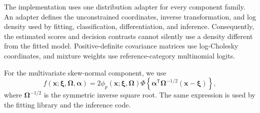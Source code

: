 The implementation uses one distribution adapter for every component family.
An adapter defines the unconstrained coordinates, inverse transformation, and
log density used by fitting, classification, differentiation, and inference.
Consequently, the estimated scores and decision contrasts cannot silently use
a density different from the fitted model.  Positive-definite covariance
matrices use log-Cholesky coordinates, and mixture weights use
reference-category multinomial logits.

\begin{center}
\end{center}

For the multivariate skew-normal component, we use
\begin{equation}
 f(\mathbf{x};\boldsymbol{\xi},\boldsymbol{\Omega},\boldsymbol{\alpha})
 =2\phi_p(\mathbf{x};\boldsymbol{\xi},\boldsymbol{\Omega})
 \Phi\!\left\{
 \boldsymbol{\alpha}^{\mathsf T}\boldsymbol{\Omega}^{-1/2}
 (\mathbf{x}-\boldsymbol{\xi})
 \right\},
 \label{eq:skew-normal-density}
\end{equation}
where $\boldsymbol{\Omega}^{-1/2}$ is the symmetric inverse square root.  The
same expression is used by the fitting library and the inference code.

